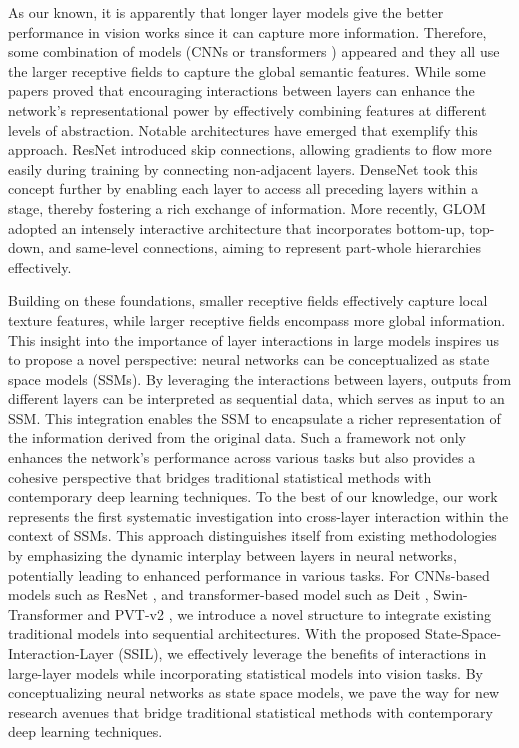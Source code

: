 As our known, it is apparently that longer layer models give the better performance in vision works since it can capture more information. Therefore, some combination of models (CNNs \citep{he2016deep,ronneberger2015unetconvolutionalnetworksbiomedical,tan2020efficientnetrethinkingmodelscaling} or transformers \citep{dosovitskiy2020image,touvron2021training,liu2021swin,wang2022pvt}) appeared and they all use the larger receptive fields to capture the global semantic features. While some papers proved that encouraging interactions between layers can enhance the network's representational power by effectively combining features at different levels of abstraction. Notable architectures have emerged that exemplify this approach. ResNet \citep{he2016deep} introduced skip connections, allowing gradients to flow more easily during training by connecting non-adjacent layers. DenseNet \citep{huang2018denselyconnectedconvolutionalnetworks} took this concept further by enabling each layer to access all preceding layers within a stage, thereby fostering a rich exchange of information. More recently, GLOM \citep{hinton2023represent} adopted an intensely interactive architecture that incorporates bottom-up, top-down, and same-level connections, aiming to represent part-whole hierarchies effectively.

Building on these foundations, smaller receptive fields effectively capture local texture features, while larger receptive fields encompass more global information. This insight into the importance of layer interactions in large models inspires us to propose a novel perspective: neural networks can be conceptualized as state space models (SSMs). By leveraging the interactions between layers, outputs from different layers can be interpreted as sequential data, which serves as input to an SSM. This integration enables the SSM to encapsulate a richer representation of the information derived from the original data. Such a framework not only enhances the network's performance across various tasks but also provides a cohesive perspective that bridges traditional statistical methods with contemporary deep learning techniques. To the best of our knowledge, our work represents the first systematic investigation into cross-layer interaction within the context of SSMs. This approach distinguishes itself from existing methodologies by emphasizing the dynamic interplay between layers in neural networks, potentially leading to enhanced performance in various tasks. For CNNs-based models such as ResNet \cite{he2016deep}, and transformer-based model such as Deit \cite{touvron2021training}, Swin-Transformer \cite{liu2021swin} and PVT-v2 \cite{wang2022pvt}, we introduce a novel structure to integrate existing traditional models into sequential architectures. With the proposed State-Space-Interaction-Layer (SSIL), we effectively leverage the benefits of interactions in large-layer models while incorporating statistical models into vision tasks. By conceptualizing neural networks as state space models, we pave the way for new research avenues that bridge traditional statistical methods with contemporary deep learning techniques.

